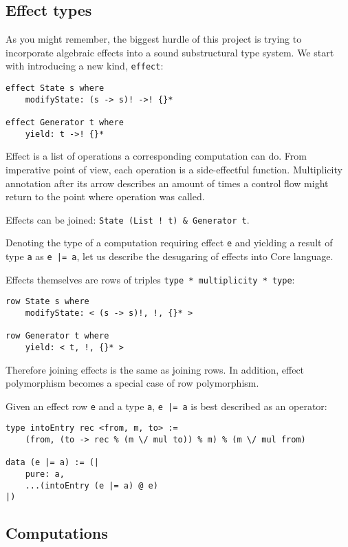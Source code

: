\documentclass[a4paper,14pt]{extreport}
\begin{document}
\subsection{Effect types}

As you might remember, the biggest hurdle of this project is trying to
incorporate algebraic effects into a sound substructural type system. We start
with introducing a new kind, \verb|effect|:

\begin{verbatim}
effect State s where
    modifyState: (s -> s)! ->! {}*

effect Generator t where
    yield: t ->! {}*
\end{verbatim}

Effect is a list of operations a corresponding computation can do. From
imperative point of view, each operation is a side-effectful function.
Multiplicity annotation after its arrow describes an amount of times a control
flow might return to the point where operation was called.

Effects can be joined: \verb|State (List ! t) & Generator t|.

Denoting the type of a computation requiring effect \verb|e| and yielding a
result of type \verb|a| as \verb+e |= a+, let us describe the desugaring of
effects into Core language.

Effects themselves are rows of triples \verb|type * multiplicity * type|:

\begin{verbatim}
row State s where
    modifyState: < (s -> s)!, !, {}* >

row Generator t where
    yield: < t, !, {}* >
\end{verbatim}

Therefore joining effects is the same as joining rows. In addition, effect
polymorphism becomes a special case of row polymorphism.

Given an effect row \verb|e| and a type \verb|a|, \verb+e |= a+ is best
described as an operator:

\begin{verbatim}
type intoEntry rec <from, m, to> :=
    (from, (to -> rec % (m \/ mul to)) % m) % (m \/ mul from)

data (e |= a) := (|
    pure: a,
    ...(intoEntry (e |= a) @ e)
|)
\end{verbatim}

\subsection{Computations}
\end{document}
